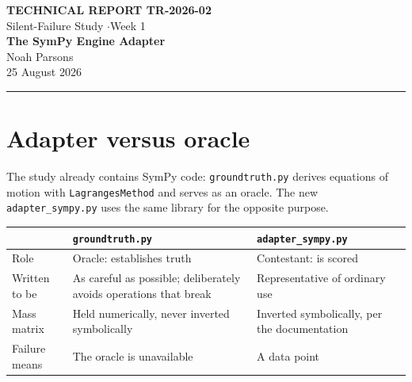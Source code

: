 \documentclass[11pt,a4paper]{article}
\begin{document}
\begin{center}
{\footnotesize\bfseries TECHNICAL REPORT TR-2026-02}\\[0.3em]
{\footnotesize Silent-Failure Study \quad$\cdot$\quad Week 1}\\[1.0em]
{\LARGE\bfseries The SymPy Engine Adapter}\\[0.7em]
{\large Noah Parsons}\\[0.3em]
{\small 25 August 2026}
\end{center}

\vspace{0.8em}
\hrule
\vspace{1.2em}

\begin{abstract}
\noindent
This report documents the second column of the cross-engine comparison: an
adapter presenting \texttt{sympy.physics.mechanics} as a scored contestant. It
records the distinction between this adapter and the study's SymPy-based
oracle, which must not be conflated; the decision to drive the library
idiomatically and the evidence behind it; and validation against the
library-independent reference across all nineteen portable systems, in both
fidelity modes, with agreement to $1.1\times10^{-14}$. The principal empirical
finding is that the two fidelity modes never disagree on any verdict within the
frozen case matrix, differing only in compile time by up to a factor of 27.5,
which reduces a contested design decision to a documented non-issue.
\end{abstract}

\section{Adapter versus oracle}

The study already contains SymPy code: \texttt{groundtruth.py} derives
equations of motion with \texttt{LagrangesMethod} and serves as an oracle. The
new \texttt{adapter\_sympy.py} uses the same library for the opposite purpose.

\begin{center}
\begin{tabular}{@{}lL{0.31\textwidth}L{0.31\textwidth}@{}}
\toprule
 & \textbf{\texttt{groundtruth.py}} & \textbf{\texttt{adapter\_sympy.py}} \\
\midrule
Role      & Oracle: establishes truth      & Contestant: is scored \\
Written to be & As careful as possible; deliberately avoids operations that break & Representative of ordinary use \\
Mass matrix & Held numerically, never inverted symbolically & Inverted symbolically, per the documentation \\
Failure means & The oracle is unavailable  & A data point \\
\bottomrule
\end{tabular}
\end{center}
\end{document}
